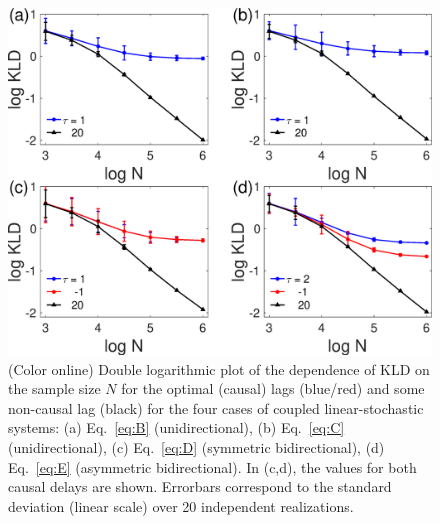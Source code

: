 \documentclass[12pt,aip,cha,reprint,nofootinbib]{revtex4-1}
\begin{document}
\begin{figure}
	\centering
	\includegraphics[width=\columnwidth]{kld_lengthBCDE.eps}
\caption{(Color online) Double logarithmic plot of the dependence of KLD on the sample size $N$ for the optimal (causal) lags (blue/red) and some non-causal lag (black) for the four cases of coupled linear-stochastic systems: (a) Eq.~\eqref{eq:B} (unidirectional), (b) Eq.~\eqref{eq:C} (unidirectional), (c) Eq.~\eqref{eq:D} (symmetric bidirectional), (d) Eq.~\eqref{eq:E} (asymmetric bidirectional). In (c,d), the values for both causal delays are shown. Errorbars correspond to the standard deviation (linear scale) over 20 independent realizations.  \label{fig:sampleSizeBCDE}}
\end{figure}
\end{document}
